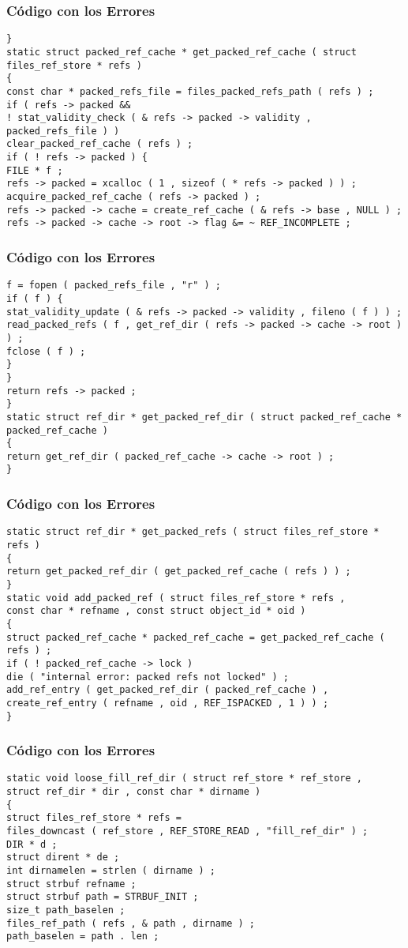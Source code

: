 \documentclass{beamer}
\begin{document}
\begin{frame}[fragile]
\frametitle{C\'odigo con los Errores}
\begin{verbatim}
} 
static struct packed_ref_cache * get_packed_ref_cache ( struct files_ref_store * refs ) 
{ 
const char * packed_refs_file = files_packed_refs_path ( refs ) ; 
if ( refs -> packed && 
! stat_validity_check ( & refs -> packed -> validity , packed_refs_file ) ) 
clear_packed_ref_cache ( refs ) ; 
if ( ! refs -> packed ) { 
FILE * f ; 
refs -> packed = xcalloc ( 1 , sizeof ( * refs -> packed ) ) ; 
acquire_packed_ref_cache ( refs -> packed ) ; 
refs -> packed -> cache = create_ref_cache ( & refs -> base , NULL ) ; 
refs -> packed -> cache -> root -> flag &= ~ REF_INCOMPLETE ; 
\end{verbatim}
\end{frame}
\begin{frame}[fragile]
\frametitle{C\'odigo con los Errores}
\begin{verbatim}
f = fopen ( packed_refs_file , "r" ) ; 
if ( f ) { 
stat_validity_update ( & refs -> packed -> validity , fileno ( f ) ) ; 
read_packed_refs ( f , get_ref_dir ( refs -> packed -> cache -> root ) ) ; 
fclose ( f ) ; 
} 
} 
return refs -> packed ; 
} 
static struct ref_dir * get_packed_ref_dir ( struct packed_ref_cache * packed_ref_cache ) 
{ 
return get_ref_dir ( packed_ref_cache -> cache -> root ) ; 
} 
\end{verbatim}
\end{frame}
\begin{frame}[fragile]
\frametitle{C\'odigo con los Errores}
\begin{verbatim}
static struct ref_dir * get_packed_refs ( struct files_ref_store * refs ) 
{ 
return get_packed_ref_dir ( get_packed_ref_cache ( refs ) ) ; 
} 
static void add_packed_ref ( struct files_ref_store * refs , 
const char * refname , const struct object_id * oid ) 
{ 
struct packed_ref_cache * packed_ref_cache = get_packed_ref_cache ( refs ) ; 
if ( ! packed_ref_cache -> lock ) 
die ( "internal error: packed refs not locked" ) ; 
add_ref_entry ( get_packed_ref_dir ( packed_ref_cache ) , 
create_ref_entry ( refname , oid , REF_ISPACKED , 1 ) ) ; 
} 
\end{verbatim}
\end{frame}
\begin{frame}[fragile]
\frametitle{C\'odigo con los Errores}
\begin{verbatim}
static void loose_fill_ref_dir ( struct ref_store * ref_store , 
struct ref_dir * dir , const char * dirname ) 
{ 
struct files_ref_store * refs = 
files_downcast ( ref_store , REF_STORE_READ , "fill_ref_dir" ) ; 
DIR * d ; 
struct dirent * de ; 
int dirnamelen = strlen ( dirname ) ; 
struct strbuf refname ; 
struct strbuf path = STRBUF_INIT ; 
size_t path_baselen ; 
files_ref_path ( refs , & path , dirname ) ; 
path_baselen = path . len ; 
\end{verbatim}
\end{frame}
\end{document}
